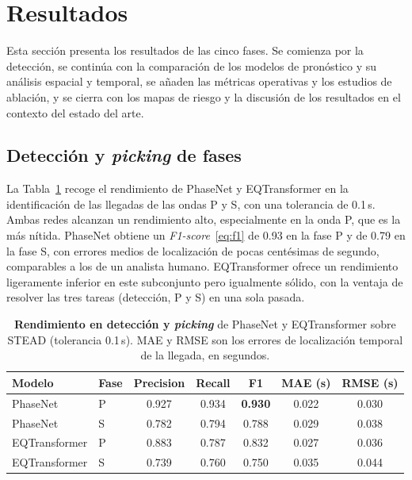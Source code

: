 \section{Resultados}
\label{resultados}

Esta sección presenta los resultados de las cinco fases. Se comienza por la detección, se
continúa con la comparación de los modelos de pronóstico y su análisis espacial y temporal, se
añaden las métricas operativas y los estudios de ablación, y se cierra con los mapas de riesgo
y la discusión de los resultados en el contexto del estado del arte.

\subsection{Detección y \textit{picking} de fases}
\label{res-deteccion}

La Tabla~\ref{tab:deteccion} recoge el rendimiento de PhaseNet y EQTransformer en la
identificación de las llegadas de las ondas P y S, con una tolerancia de 0.1\,s. Ambas redes
alcanzan un rendimiento alto, especialmente en la onda P, que es la más nítida. PhaseNet obtiene
un \textit{F1-score}~\eqref{eq:f1} de 0.93 en la fase P y de 0.79 en la fase S, con errores
medios de localización de pocas centésimas de segundo, comparables a los de un analista humano.
EQTransformer ofrece un rendimiento ligeramente inferior en este subconjunto pero igualmente
sólido, con la ventaja de resolver las tres tareas (detección, P y S) en una sola pasada.

\begin{table}[ht!]
  \centering
  \small
  \begin{tabular}{@{}llccccc@{}}
    \toprule
    \textbf{Modelo} & \textbf{Fase} & \textbf{Precision} & \textbf{Recall} & \textbf{F1}    & \textbf{MAE (s)} & \textbf{RMSE (s)} \\
    \midrule
    PhaseNet        & P             & 0.927              & 0.934           & \textbf{0.930} & 0.022            & 0.030             \\
    PhaseNet        & S             & 0.782              & 0.794           & 0.788          & 0.029            & 0.038             \\
    EQTransformer   & P             & 0.883              & 0.787           & 0.832          & 0.027            & 0.036             \\
    EQTransformer   & S             & 0.739              & 0.760           & 0.750          & 0.035            & 0.044             \\
    \bottomrule
  \end{tabular}
  \caption[Resultados de detección y \textit{picking} de fases P y S]{\textbf{Rendimiento en detección y \textit{picking}} de PhaseNet y EQTransformer sobre STEAD (tolerancia 0.1\,s). MAE y RMSE son los errores de localización temporal de la llegada, en segundos.}
  \label{tab:deteccion}
\end{table}

